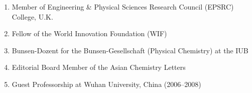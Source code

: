 \begin{enumerate}
\item Member of Engineering \& Physical Sciences Research Council (EPSRC) College, U.K.
\item Fellow of the World Innovation Foundation (WIF)
\item Bunsen-Dozent for the Bunsen-Gesellschaft (Physical Chemistry) at the IUB
\item Editorial Board Member of the Asian Chemistry Letters
\item Guest Professorship at Wuhan University, China (2006--2008)
\end{enumerate}

\nocite{KON-7-06, KON-697-06, KON-289-06, SAC-305-06, MAT-226-06, SAC-online-06, SCA-press-06, KON-press-06}

%
%

%
